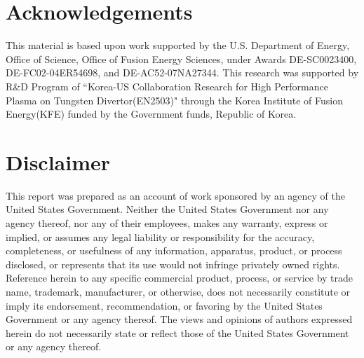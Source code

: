 \documentclass[10pt]{iopart}
\begin{document}
\section*{Acknowledgements}

This material is based upon work supported by the U.S. Department of Energy, Office of Science, Office of Fusion Energy Sciences,
under Awards 
DE-SC0023400, %
DE-FC02-04ER54698,
and
DE-AC52-07NA27344.  %
This research was supported by R\&D Program of ``Korea-US Collaboration Research for High Performance Plasma on Tungsten Divertor(EN2503)" through the Korea Institute of Fusion Energy(KFE) funded by the Government funds, Republic of Korea.


\section*{Disclaimer}

This report was prepared as an account of work sponsored by an agency of the United States Government.
Neither the United States Government nor any agency thereof, nor any of their employees, makes any warranty, express or implied, or assumes any legal liability or responsibility for the accuracy, completeness, or usefulness of any information, apparatus, product, or process disclosed, or represents that its use would not infringe privately owned rights. 
Reference herein to any specific commercial product, process, or service by trade name, trademark, manufacturer, or otherwise, does not necessarily constitute or imply its endorsement, recommendation, or favoring by the United States Government or any agency thereof.
The views and opinions of authors expressed herein do not necessarily state or reflect those of the United States Government or any agency thereof.


\end{document}
